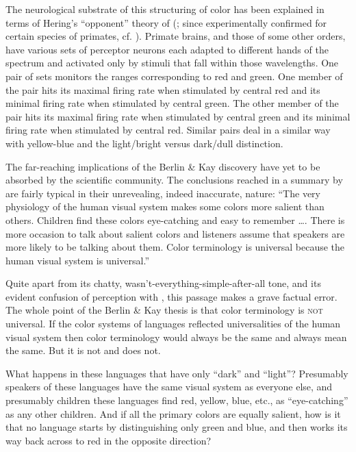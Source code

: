 The neurological substrate of this structuring of color has been explained \citep{McDaniel1974,Kay1978} in terms of Hering's ``opponent'' theory of  (\citealt{Hering1920}; since experimentally confirmed for certain species of primates, cf. \citealt{deValoisEtAl}). Primate brains, and those of some other orders, have various sets of perceptor neurons each adapted to different hands of the spectrum and activated only by stimuli that fall within those wavelengths. One pair of sets monitors the ranges corresponding to red and green. One member of the pair hits its maximal firing rate when stimulated by central red and its minimal firing rate when stimulated by central green. The other member of the pair hits its maximal firing rate when stimulated by central green and its minimal firing rate when stimulated by central red. Similar pairs deal in a similar way with yellow-blue and the light/bright versus dark/dull distinction.

The far-reaching implications of the Berlin \& Kay discovery have yet to be absorbed by the scientific community. The conclusions reached in a summary by \citet[527]{ClarkEtAl1977} are fairly typical in their unrevealing, indeed inaccurate, nature: ``The very physiology of the human visual system makes some colors more salient than others. Children find these colors eye-catching and easy to remember \ldots. There is more occasion to talk about salient colors and listeners assume that speakers are more likely to be talking about them. Color terminology is universal because the human visual system is universal.''

Quite apart from its chatty, wasn't-everything-simple-after-all tone, and its evident confusion of perception with , this passage makes a grave factual error. The whole point of the Berlin \& Kay thesis is that color terminology is \textsc{not} universal. If the color systems of languages reflected universalities of the human visual system then color terminology would always be the same and always mean the same. But it is not and does not.

What happens in these languages that have only ``dark'' and ``light''? Presumably speakers of these languages have the same visual system as everyone else, and presumably children  these languages
find red, yellow, blue, etc., as ``eye-catching'' as any other children. And if all the primary colors are equally salient, how is it that no language starts by distinguishing only green and blue, and then works its way back across to red in the opposite direction?

